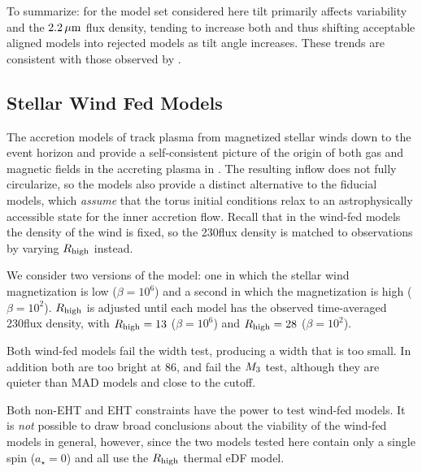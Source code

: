 To summarize: for the model set considered here tilt primarily affects variability and the $2.2\,\mu\mathrm{m}$ flux density, tending to increase both and thus shifting acceptable aligned models into rejected models as tilt angle increases.  These trends are consistent with those observed by \cite{2021arXiv210412896W}.

\subsection{Stellar Wind Fed Models}

The accretion models of \cite{2020ApJ...896L...6R, 2020MNRAS.492.3272R, 2018MNRAS.478.3544R} track plasma from  magnetized stellar winds down to the event horizon and provide a self-consistent picture of the origin of both gas and magnetic fields in the accreting plasma in \sgra.  The resulting inflow does not fully circularize, so the models also provide a distinct alternative to the fiducial models, which {\em assume} that the torus initial conditions relax to an astrophysically accessible state for the inner accretion flow.  Recall that in the wind-fed models the density of the wind is fixed, so the 230\GHz flux density is matched to observations by varying $R_\mathrm{high}$ instead.  

We consider two versions of the model: one in which the stellar wind magnetization is low ($\beta = 10^6$) and a second in which the magnetization is high ($\beta = 10^2$). $R_\mathrm{high}$ is adjusted until each model has the observed time-averaged 230\GHz flux density, with $R_\mathrm{high} = 13$ ($\beta = 10^6$) and $R_\mathrm{high} = 28$ ($\beta = 10^2$).

Both wind-fed models fail the \mring width test, producing a width that is too small.  In addition both are too bright at 86\GHz, and fail the $M_{3}$ test, although they are quieter than MAD models and close to the cutoff.   %

Both non-EHT and EHT constraints have the power to test wind-fed models.  It is {\em not} possible to draw broad conclusions about the viability of the wind-fed models in general, however, since the two models tested here contain only a single spin ($a_\star=0$) and all use the $R_\mathrm{high}$ thermal eDF model.

